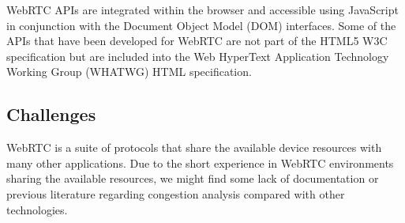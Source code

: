 WebRTC APIs are integrated within the browser and accessible using JavaScript in conjunction with the Document Object Model (DOM) interfaces. Some of the APIs that have been developed for WebRTC are not part of the HTML5 W3C specification but are included into the Web HyperText Application Technology Working Group (WHATWG)  HTML specification.

%



\subsection{Challenges}

WebRTC is a suite of protocols that share the available device resources with many other applications. Due to the short experience in WebRTC environments sharing the available resources, we might find some lack of documentation or previous literature regarding congestion analysis compared with other technologies. 

